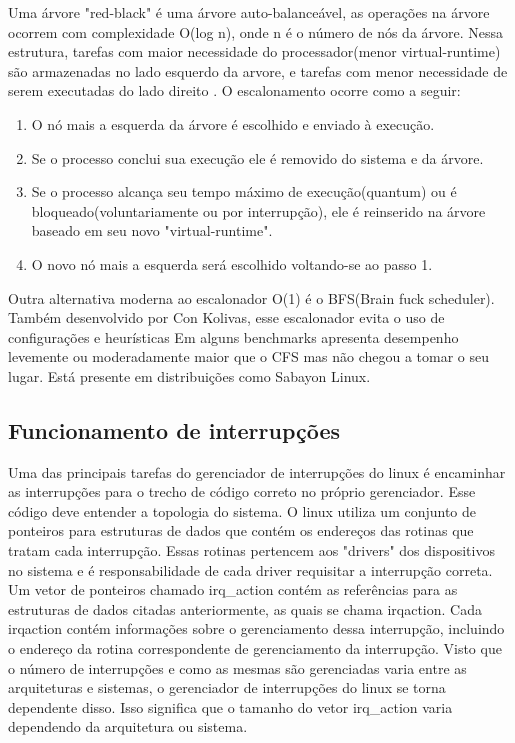\documentclass[conference]{IEEEtran}
\begin{document}
Uma árvore "red-black" é uma árvore auto-balanceável, as operações na árvore ocorrem com complexidade O(log n), onde n é o número de nós da árvore. Nessa estrutura, tarefas com maior necessidade do processador(menor virtual-runtime) são armazenadas no lado esquerdo da arvore, e tarefas com menor necessidade de serem executadas do lado direito \cite{LinuxSchedulerIBM}. O escalonamento ocorre como a seguir:
\begin{enumerate}
	\item O nó mais a esquerda da árvore é escolhido e enviado à execução.
	\item Se o processo conclui sua execução ele é removido do sistema e da árvore.
	\item Se o processo alcança seu tempo máximo de execução(quantum) ou é bloqueado(voluntariamente ou por interrupção), ele é reinserido na árvore baseado em seu novo "virtual-runtime".
	\item O novo nó mais a esquerda será escolhido voltando-se ao passo 1.\cite{LinuxSchedulerWiki}
\end{enumerate}

Outra alternativa moderna ao escalonador O(1) é o BFS(Brain fuck scheduler).\cite{LinuxSchedulerWiki} Também desenvolvido por Con Kolivas, esse escalonador evita o uso de configurações e heurísticas Em alguns benchmarks apresenta desempenho levemente ou moderadamente maior que o CFS mas não chegou a tomar o seu lugar. Está presente em distribuições como Sabayon Linux\cite{LinuxSchedulerBFS}.
\subsection{Funcionamento de interrupções}\label{sec:LinuxInt}
Uma das principais tarefas do gerenciador de interrupções do linux é encaminhar as interrupções para o trecho de código correto no próprio gerenciador. Esse código deve entender a topologia do sistema. O linux utiliza um conjunto de ponteiros para estruturas de dados que contém os endereços das rotinas que tratam cada interrupção. Essas rotinas pertencem aos "drivers" dos dispositivos no sistema e é responsabilidade de cada driver requisitar a interrupção correta. Um vetor de ponteiros chamado irq\_action contém as referências para as estruturas de dados citadas anteriormente, as quais se chama irqaction. Cada irqaction contém informações sobre o gerenciamento dessa interrupção, incluindo o endereço da rotina correspondente de gerenciamento da interrupção. Visto que o número de interrupções e como as mesmas são gerenciadas varia entre as arquiteturas e sistemas, o gerenciador de interrupções do linux se torna dependente disso. Isso significa que o tamanho do vetor irq\_action varia dependendo da arquitetura ou sistema.\\
\end{document}
